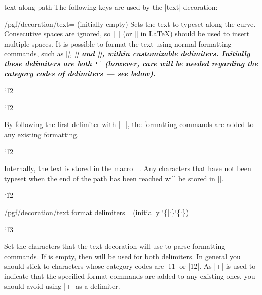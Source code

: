 \begin{decoration}{text along path}
  The following keys are used by the |text| decoration:
  \begin{key}{/pgf/decoration/text=
      (initially \normalfont empty)}
    Sets the text to typeset along the curve.
    Consecutive spaces are ignored, so |\ | (or |\space| in \LaTeX)
    should be used to insert multiple spaces.  It is possible to
    format the text using normal formatting commands, such as |\it|, |\bf|
    and |\color|, within customizable delimiters. Initially these
    delimiters are both {\tt\char`\|} (however, care will be needed
    regarding  the category codes of delimiters --- see below).

{\catcode`\|12
\begin{codeexample}[]
\catcode`\|12
\end{codeexample}
}
    By following the first delimiter
    with |+|, the formatting commands are added to any existing
    formatting.

{\catcode`\|12
\begin{codeexample}[]
\end{codeexample}
}
  
    Internally, the text is stored in the macro |\pgfdecorationtext|.
    Any characters that have not been typeset when the end of the
    path has been reached will be stored in |\pgfdecorationrestoftext|.

  \end{key}

{\catcode`\|12
  \begin{key}{/pgf/decoration/text format delimiters= (initially \char`\{|\char`\}\char`\{\char`\})}

    \catcode`\|13
  
    Set the characters that the text decoration will use to parse
    formatting commands.
    If  is empty, then  will be used for both
    delimiters.
    In general you should stick to characters  whose category codes are
    |11| or |12|.
    As |+| is used to indicate that the specified format commands
    are added  to any existing ones, you should avoid using |+| as
    a delimiter.


\end{key}}
\end{decoration}
